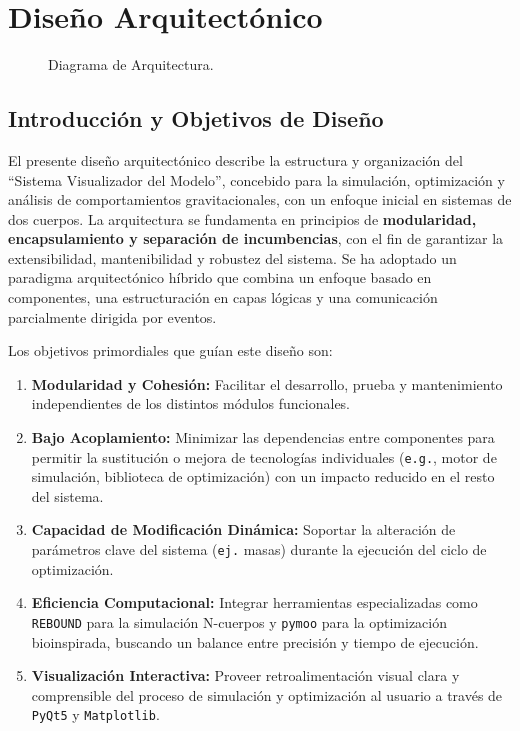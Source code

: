 \section{Diseño Arquitectónico}%
\label{sec:diseno-arquitectonico}

\begin{figure}[H] %
    \centering
    \caption{Diagrama de Arquitectura.}%
    \label{fig:architecture_diagram} %
\end{figure}

\subsection{Introducción y Objetivos de Diseño}

El presente diseño arquitectónico describe la estructura y organización del ``Sistema Visualizador del Modelo'', concebido para la simulación, optimización y análisis de comportamientos gravitacionales, con un enfoque inicial en sistemas de dos cuerpos. La arquitectura se fundamenta en principios de \textbf{modularidad, encapsulamiento y separación de incumbencias}, con el fin de garantizar la extensibilidad, mantenibilidad y robustez del sistema. Se ha adoptado un paradigma arquitectónico híbrido que combina un enfoque basado en componentes, una estructuración en capas lógicas y una comunicación parcialmente dirigida por eventos.

Los objetivos primordiales que guían este diseño son:
\begin{enumerate}
    \item \textbf{Modularidad y Cohesión:} Facilitar el desarrollo, prueba y mantenimiento independientes de los distintos módulos funcionales.
    \item \textbf{Bajo Acoplamiento:} Minimizar las dependencias entre componentes para permitir la sustitución o mejora de tecnologías individuales (\texttt{e.g.}, motor de simulación, biblioteca de optimización) con un impacto reducido en el resto del sistema.
    \item \textbf{Capacidad de Modificación Dinámica:} Soportar la alteración de parámetros clave del sistema (\texttt{ej.} masas) durante la ejecución del ciclo de optimización.
    \item \textbf{Eficiencia Computacional:} Integrar herramientas especializadas como \texttt{REBOUND} para la simulación N-cuerpos y \texttt{pymoo} para la optimización bioinspirada, buscando un balance entre precisión y tiempo de ejecución.
    \item \textbf{Visualización Interactiva:} Proveer retroalimentación visual clara y comprensible del proceso de simulación y optimización al usuario a través de \texttt{PyQt5} y \texttt{Matplotlib}.
\end{enumerate}

